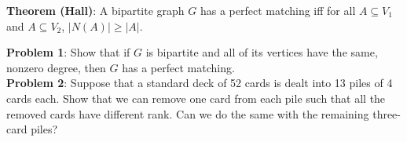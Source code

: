 \documentclass{amsart}
\begin{document}
	\noindent \textbf{Theorem (Hall)}: A bipartite graph $G$ has a perfect matching iff for all $A\subseteq V_1$ and $A\subseteq V_2$, $|N(A)|\geq |A|$.\\
	
%	
	
%		
%		
%		
	
	\newpage
	
	\bigskip
	
	\noindent \textbf{Problem 1}: Show that if $G$ is bipartite and all of its vertices have the same, nonzero degree, then $G$ has a perfect matching.\\
	
	\noindent \textbf{Problem 2}: Suppose that a standard deck of 52 cards is dealt into 13 piles of 4 cards each. Show that we can remove one card from each pile such that all the removed cards have different rank. Can we do the same with the remaining three-card piles?\\
	
\end{document}
